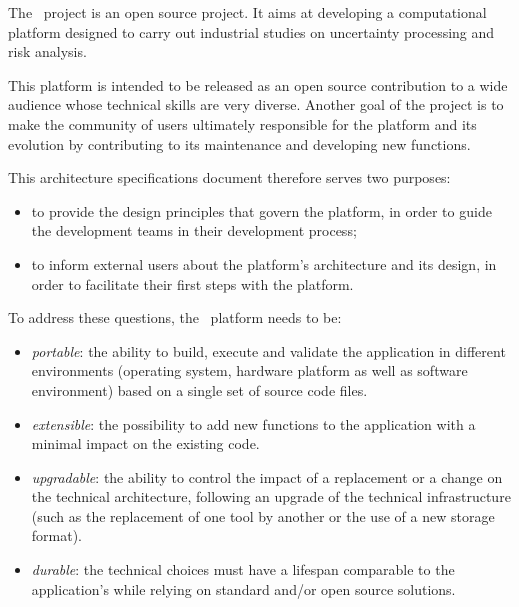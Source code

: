 
The \OT\ project is an open source project. It aims at developing a computational platform designed to carry out industrial studies on uncertainty processing and risk analysis.

This platform is intended to be released as an open source contribution to a wide audience whose technical skills are very diverse. Another goal of the project is to make the community of users ultimately responsible for the platform and its evolution by contributing to its maintenance and developing new functions.

This architecture specifications document therefore serves two purposes:
\begin{itemize}
\item to provide the design principles that govern the platform, in order to guide the development teams in their development process;
\item to inform external users about the platform's architecture and its design, in order to facilitate their first steps with the platform.
\end{itemize}

%
%

To address these questions, the \OT\ platform needs to be:
\begin{itemize}
\item \emph{portable}: the ability to build, execute and validate the application in different environments (operating system, hardware platform as well as software environment) based on a single set of source code files.
\item \emph{extensible}: the possibility to add new functions to the application with a minimal impact on the existing code.
\item \emph{upgradable}: the ability to control the impact of a replacement or a change on the technical architecture, following an upgrade of the technical infrastructure (such as the replacement of one tool by another or the use of a new storage format).
\item \emph{durable}: the technical choices must have a lifespan comparable to the application's while relying on standard and/or open source solutions.
\end{itemize}


